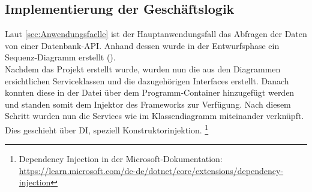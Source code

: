 \subsection{Implementierung der Geschäftslogik}
\label{sec:ImplementierungGeschaeftslogik}
Laut \ref{sec:Anwendungsfaelle}  ist der Hauptanwendungsfall
das Abfragen der Daten von einer Datenbank-API. Anhand dessen wurde in der Entwurfsphase ein
Sequenz-Diagramm erstellt (\Vgl {}).\\
Nachdem das Projekt erstellt wurde, wurden nun die aus den Diagrammen ersichtlichen Serviceklassen
und die dazugehörigen Interfaces erstellt. Danach konnten diese in der Datei 
über  dem Programm-Container hinzugefügt werden und standen somit 
dem Injektor des Frameworks zur Verfügung. Nach diesem Schritt wurden nun die Services wie
im Klassendiagramm  miteinander verknüpft.
Dies geschieht über \acs{DI}, speziell Konstruktorinjektion. \footnote{Dependency Injection in der Microsoft-Dokumentation:\\ 
\url{https://learn.microsoft.com/de-de/dotnet/core/extensions/dependency-injection}}\\

